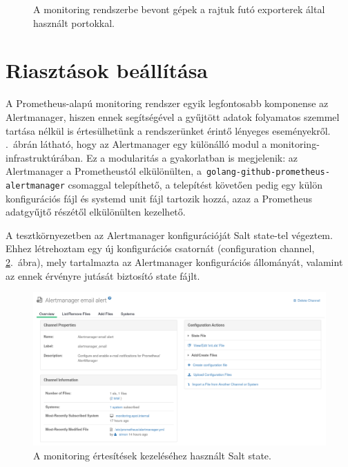 \begin{figure}[ht]
	\centering
	
	\caption{A monitoring rendszerbe bevont gépek a rajtuk futó exporterek által használt portokkal.}
	\label{fig:monitoring-setup}
\end{figure}

\section{Riasztások beállítása}
A Prometheus-alapú monitoring rendszer egyik legfontosabb komponense az Alertmanager, hiszen ennek segítségével a gyűjtött adatok folyamatos szemmel tartása nélkül is értesülhetünk a rendszerünket érintő lényeges eseményekről.
.~ábrán látható, hogy az Alertmanager egy különálló modul a monitoring-infrastruktúrában. Ez a modularitás a gyakorlatban is megjelenik: az Alertmanager a Prometheustól elkülönülten, a~\texttt{golang-github-prometheus-alertmanager} csomaggal telepíthető, a telepítést követően pedig egy külön konfigurációs fájl és systemd unit fájl tartozik hozzá, azaz a Prometheus adatgyűjtő részétől elkülönülten kezelhető.

A tesztkörnyezetben az Alertmanager konfigurációját Salt state-tel végeztem. Ehhez létrehoztam egy új konfigurációs csatornát (configuration channel, \ref{fig:alertmanager-state}.~ábra), mely tartalmazta az Alertmanager konfigurációs állományát, valamint az ennek érvényre jutását biztosító state fájlt.

\begin{figure}
	\centering
	\includegraphics[width=15cm]{figures/alertmanager-state.png}
	\caption{A monitoring értesítések kezeléséhez használt Salt state.}
	\label{fig:alertmanager-state}
\end{figure}

